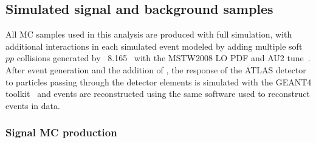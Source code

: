 \subsection{Simulated signal and background samples}
All MC samples used in this analysis are produced with full simulation, with additional \pileup interactions in each simulated event 
modeled by adding multiple soft $pp$ collisions
generated by \Pythia~8.165~\cite{pythia8} with the MSTW2008 LO PDF and AU2 tune~\cite{MC12AU2}.  After event generation and the addition of \pileup, 
the response of the ATLAS detector to particles
passing through the detector elements is simulated with the GEANT4 toolkit~\cite{Geant4,simulation}
and events are reconstructed using the same software used to reconstruct events in data.

\subsubsection{Signal MC production}


